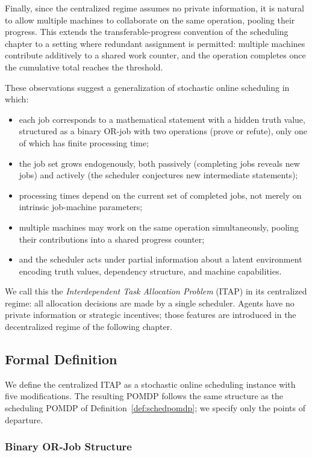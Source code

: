 Finally, since the centralized regime assumes no private information, it is natural
to allow multiple machines to collaborate on the same operation, pooling their
progress. This extends the transferable-progress convention of the scheduling chapter
to a setting where redundant assignment is permitted: multiple machines contribute
additively to a shared work counter, and the operation completes once the cumulative
total reaches the threshold.

These observations suggest a generalization of stochastic online scheduling in which:
\begin{itemize}
    \item each job corresponds to a mathematical statement with a hidden truth value,
    structured as a binary OR-job with two operations (prove or refute), only one of
    which has finite processing time;
    \item the job set grows endogenously, both passively (completing jobs reveals new
    jobs) and actively (the scheduler conjectures new intermediate statements);
    \item processing times depend on the current set of completed jobs, not merely on
    intrinsic job-machine parameters;
    \item multiple machines may work on the same operation simultaneously, pooling
    their contributions into a shared progress counter;
    \item and the scheduler acts under partial information about a latent environment
    encoding truth values, dependency structure, and machine capabilities.
\end{itemize}

We call this the \emph{Interdependent Task Allocation Problem} (ITAP) in its
centralized regime: all allocation decisions are made by a single scheduler. Agents
have no private information or strategic incentives; those features are introduced in
the decentralized regime of the following chapter.


\subsection{Formal Definition}

We define the centralized ITAP as a stochastic online scheduling instance with five
modifications. The resulting POMDP follows the same structure as the scheduling POMDP
of Definition~\ref{def:schedpomdp}; we specify only the points of departure.

\subsubsection{Binary OR-Job Structure}

